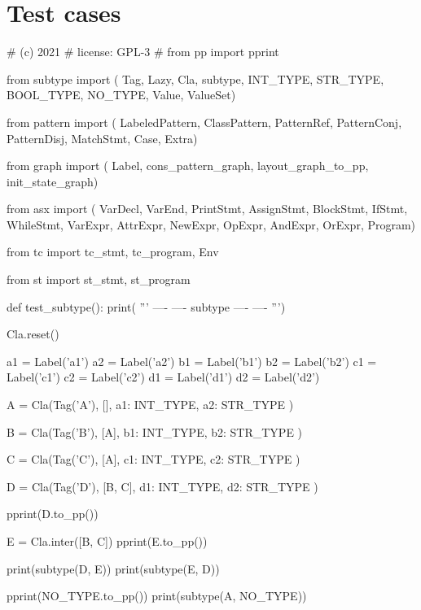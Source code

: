\section{Test cases}

\begin{dispPy}
#    (c) 2021 
#    license:          GPL-3
#
from pp import pprint

from subtype import (
    Tag,        Lazy,       Cla,        subtype,    INT_TYPE,
    STR_TYPE,   BOOL_TYPE,  NO_TYPE,    Value,      ValueSet)

from pattern import (
    LabeledPattern, ClassPattern,   PatternRef, PatternConj,
    PatternDisj,    MatchStmt,      Case,       Extra)

from graph import (
    Label,  cons_pattern_graph, layout_graph_to_pp,
    init_state_graph)

from asx import (
    VarDecl,    VarEnd,     PrintStmt,  AssignStmt, BlockStmt,
    IfStmt,     WhileStmt,  VarExpr,    AttrExpr,   NewExpr,
    OpExpr,     AndExpr,    OrExpr,     Program)

from tc import tc_stmt, tc_program, Env

from st import st_stmt, st_program

def test_subtype():
    print(
'''
----
---- subtype ----
----
''')

    Cla.reset()

    a1 = Label('a1')
    a2 = Label('a2')
    b1 = Label('b1')
    b2 = Label('b2')
    c1 = Label('c1')
    c2 = Label('c2')
    d1 = Label('d1')
    d2 = Label('d2')

    A = Cla(Tag('A'),
        [],
        {
            a1: INT_TYPE,
            a2: STR_TYPE
        })

    B = Cla(Tag('B'),
        [A],
        {
            b1: INT_TYPE,
            b2: STR_TYPE
        })

    C = Cla(Tag('C'),
        [A],
        {
            c1: INT_TYPE,
            c2: STR_TYPE
        })

    D = Cla(Tag('D'),
        [B, C],
        {
            d1: INT_TYPE,
            d2: STR_TYPE
        })

    pprint(D.to_pp())

    E = Cla.inter([B, C])
    pprint(E.to_pp())

    print(subtype(D, E))
    print(subtype(E, D))

    pprint(NO_TYPE.to_pp())
    print(subtype(A, NO_TYPE))


\end{dispPy}
